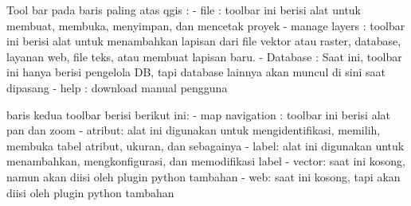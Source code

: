 	Tool bar pada baris paling atas qgis :
	- file : toolbar ini berisi alat untuk membuat, membuka, menyimpan, dan mencetak proyek
	- manage layers : toolbar ini berisi alat untuk menambahkan lapisan dari file vektor atau raster, database, layanan web, file teks, atau membuat lapisan baru.
	- Database : Saat ini, toolbar ini hanya berisi pengelola DB, tapi database lainnya akan muncul di sini saat dipasang
	- help : download manual pengguna

	baris kedua toolbar berisi berikut ini:
	- map navigation : toolbar ini berisi alat pan dan zoom
	- atribut: alat ini digunakan untuk mengidentifikasi, memilih, membuka tabel atribut, ukuran, dan sebagainya
	- label: alat ini digunakan untuk menambahkan, mengkonfigurasi, dan memodifikasi label
	- vector: saat ini kosong, namun akan diisi oleh plugin python tambahan
	- web: saat ini kosong, tapi akan diisi oleh plugin python tambahan
